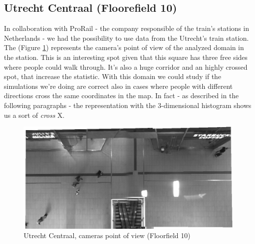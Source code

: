 \documentclass[class=article, crop=false]{standalone}
\begin{document}



\subsection{Utrecht Centraal (Floorefield 10)}
In collaboration with ProRail - the company responsible of the train's stations in Netherlands - we had the possibility to use data from the Utrecht's train station.
The (Figure \ref{trainf10}) represents the camera's point of view of the analyzed domain in the station.
This is an interesting spot given that this square has three free sides where people could walk through.
It's also a huge corridor and an highly crossed spot, that increase the statistic.
With this domain we could study if the simulations we're doing are correct also in cases where people with different directions cross the same coordinates in the map.
In fact - as described in the following paragraphs - the representation with the 3-dimensional histogram shows us a sort of \emph{cross} X.
\begin{figure}[h]
\centering
\includegraphics[width=0.4\textheight]{imgs/bg10.png}
\caption{Utrecht Centraal, cameras point of view (Floorfield 10)}
\label{trainf10}
\end{figure}
\end{document}
